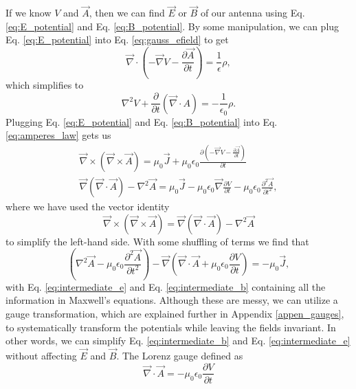 \documentclass[10pt]{article}
\begin{document}
If we know $V$ and $\vec{A}$, then we can find $\vec{E}$ or $\vec{B}$ of our antenna using Eq. \ref{eq:E_potential} and Eq. \ref{eq:B_potential}. By some manipulation, we can plug Eq. \ref{eq:E_potential} into Eq. \ref{eq:gauss_efield} to get
\begin{equation}
\vec{\nabla} \cdot (-\vec{\nabla} V - \frac{\partial \vec{A}}{\partial t})= \frac{1}{\epsilon}\rho,
\end{equation}
which simplifies to
\begin{equation}
\nabla^2 V + \frac{\partial}{\partial t}(\vec{\nabla} \cdot A) = - \frac{1}{\epsilon_0}\rho.
    \label{eq:intermediate_e}
\end{equation}
Plugging Eq. \ref{eq:E_potential} and Eq. \ref{eq:B_potential} into Eq. \ref{eq:amperes_law} gets us
\begin{align}
\vec{\nabla} \times (\vec{\nabla} \times \vec{A}) = \mu_0\vec{J} + \mu_0\epsilon_0\frac{\partial (-\vec{\nabla} V - \frac{\partial \vec{A}}{\partial t})}{\partial t}\\
\vec{\nabla} (\vec{\nabla} \cdot \vec{A}) - \nabla^2 \vec{A} = \mu_0\vec{J} - \mu_0\epsilon_0\vec{\nabla}\frac{\partial V}{\partial t} - \mu_0\epsilon_0\frac{\partial^2 \vec{A}}{\partial t^2},
\end{align}
where we have used the vector identity
\begin{equation}
\vec{\nabla} \times (\vec{\nabla} \times \vec{A}) = \vec{\nabla} (\vec{\nabla} \cdot \vec{A}) - \nabla^2 \vec{A}
\end{equation}
to simplify the left-hand side. With some shuffling of terms we find that
\begin{equation}
(\nabla^2 \vec{A} - \mu_0 \epsilon_0 \frac{\partial^2 \vec{A}}{\partial t^2}) - \vec{\nabla}(\vec{\nabla} \cdot \vec{A} + \mu_0 \epsilon_0 \frac{\partial V}{\partial t}) = - \mu_0 \vec{J},
    \label{eq:intermediate_b}
\end{equation}
with Eq. \ref{eq:intermediate_e} and Eq. \ref{eq:intermediate_b} containing all the information in Maxwell’s equations. Although these are messy, we can utilize a gauge transformation, which are explained further in Appendix \ref{appen_gauges}, to systematically transform the potentials while leaving the fields invariant. In other words, we can simplify Eq. \ref{eq:intermediate_b} and Eq. \ref{eq:intermediate_e} without affecting $\vec{E}$ and $\vec{B}$. The Lorenz gauge defined as
\begin{equation}
\vec{\nabla} \cdot \vec{A} = -\mu_0\epsilon_0\frac{\partial V}{\partial t}
    \label{eq:lorenz_gauge}
\end{equation}
\end{document}
